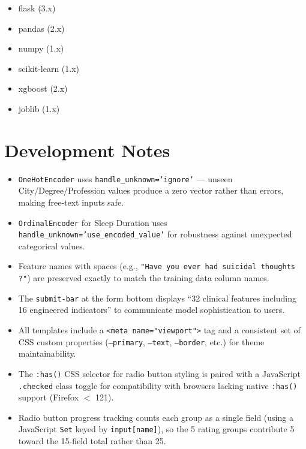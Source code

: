 \documentclass[11pt,a4paper]{article}
\begin{document}
\begin{itemize}[nosep]
    \item flask (3.x)
    \item pandas (2.x)
    \item numpy (1.x)
    \item scikit-learn (1.x)
    \item xgboost (2.x)
    \item joblib (1.x)
\end{itemize}

\section{Development Notes}

\begin{itemize}[nosep]
    \item \texttt{OneHotEncoder} uses \texttt{handle\_unknown='ignore'} --- unseen City/Degree/Profession values produce a zero vector rather than errors, making free-text inputs safe.
    \item \texttt{OrdinalEncoder} for Sleep Duration uses \texttt{handle\_unknown='use\_encoded\_value'} for robustness against unexpected categorical values.
    \item Feature names with spaces (e.g., \texttt{"Have you ever had suicidal thoughts ?"}) are preserved exactly to match the training data column names.
    \item The \texttt{submit-bar} at the form bottom displays ``32 clinical features including 16 engineered indicators'' to communicate model sophistication to users.
    \item All templates include a \texttt{<meta name="viewport">} tag and a consistent set of CSS custom properties (\texttt{--primary}, \texttt{--text}, \texttt{--border}, etc.) for theme maintainability.
    \item The \texttt{:has()} CSS selector for radio button styling is paired with a JavaScript \texttt{.checked} class toggle for compatibility with browsers lacking native \texttt{:has()} support (Firefox $<$ 121).
    \item Radio button progress tracking counts each group as a single field (using a JavaScript \texttt{Set} keyed by \texttt{input[name]}), so the 5 rating groups contribute 5 toward the 15-field total rather than 25.
\end{itemize}

\end{document}
